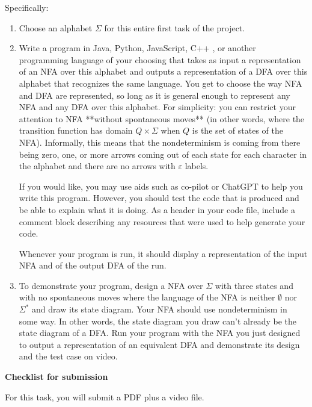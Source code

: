 Specifically:

\begin{enumerate}
\item Choose an alphabet $\Sigma$ for this entire first task of the project.
\item Write a program in Java, Python, JavaScript, C++ , or another programming language of your choosing
 that takes as input a representation of an NFA over this alphabet and outputs
 a representation of a DFA over this alphabet that recognizes the same language. 
 You get to choose the way NFA and DFA are represented, so long as it is
 general enough to represent any NFA and any DFA over this alphabet. For simplicity: you can 
 restrict your attention to NFA **without spontaneous moves** (in other words, where the transition function 
 has domain $Q \times \Sigma$ when $Q$ is the set of states of the NFA). Informally, this means
 that the nondeterminism is coming from there being zero, one, or more arrows coming out of each state
 for each character in the alphabet and there are no arrows with $\varepsilon$ labels.

 If you would like, you may use aids such as co-pilot or ChatGPT to help you write this program. 
 However, you should test the code that is produced and be able to explain what it is doing. 
 As a header in your code file, include a comment block describing any resources that were used to 
 help generate your code.

 Whenever your program is run, it should display a representation of the input NFA and 
 of the output DFA of the run.

\item To demonstrate your program, design a NFA over $\Sigma$ with three states and with no spontaneous moves 
where the language of the NFA is neither $\emptyset$ nor $\Sigma^*$ and draw its state diagram.
Your NFA should use nondeterminism in some way. In other words, the state diagram you draw can't 
already be the state diagram of a DFA. Run your program with the NFA you just designed to output a 
representation of an equivalent DFA and
demonstrate its design and the test case on video.

\end{enumerate}

{\bf Checklist for submission}

For this task, you will submit a PDF plus a video file.

